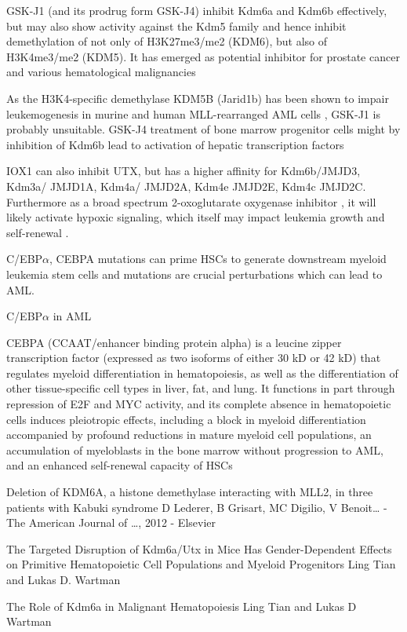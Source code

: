 GSK-J1 (and its prodrug form GSK-J4) inhibit Kdm6a and Kdm6b effectively\cite{Kruidenier2012}, but may also show activity against the Kdm5 family\cite{Heinemann2014} and hence inhibit demethylation of not only of H3K27me3/me2 (KDM6), but also of H3K4me3/me2 (KDM5). It has emerged as potential inhibitor for prostate cancer\cite{Morozov2017} and various hematological malignancies \cite{Mathur2017,Boila2017} 


As the H3K4-specific demethylase KDM5B (Jarid1b) has been shown to impair leukemogenesis in murine and human MLL-rearranged AML cells \cite{Wong2015}, GSK-J1 is probably unsuitable. GSK-J4 treatment of bone marrow progenitor cells might by inhibition of Kdm6b lead to activation of hepatic transcription factors \cite{Kochat2017}

IOX1 can also inhibit UTX, but has a higher affinity for Kdm6b/JMJD3, Kdm3a/ JMJD1A, Kdm4a/ JMJD2A, Kdm4e JMJD2E, Kdm4c JMJD2C.\cite{King2010,Schiller2014} Furthermore as a broad spectrum 2-oxoglutarate oxygenase inhibitor \cite{Hopkinson2013}, it will likely activate hypoxic signaling, which itself may impact leukemia growth and self-renewal \cite{Velasco-Hernandez2014,Roychoudhury2015}. 


C/EBP$\alpha$\cite{Rapino2013,Oevelen2015,Cirovic2017}, CEBPA mutations can prime HSCs to generate downstream myeloid leukemia stem cells\cite{Bereshchenko2009} and mutations are crucial perturbations which can lead to AML\cite{Pabst2007,Koschmieder2008}.

C/EBP$\alpha$ in AML
\cite{Hackanson2008}

CEBPA (CCAAT/enhancer binding protein alpha) is a leucine zipper transcription factor (expressed as two isoforms of either 30 kD or 42 kD) that regulates myeloid differentiation in hematopoiesis, as well as the differentiation of other tissue-specific cell types in liver, fat, and lung. It functions in part through repression of E2F and MYC activity, and its complete absence in hematopoietic cells induces pleiotropic effects, including a block in myeloid differentiation accompanied by profound reductions in mature myeloid cell populations, an accumulation of myeloblasts in the bone marrow without progression to AML, and an enhanced self-renewal capacity of HSCs \cite{Somervaille2009a} %


Deletion of KDM6A, a histone demethylase interacting with MLL2, in three patients with Kabuki syndrome
D Lederer, B Grisart, MC Digilio, V Benoit… - The American Journal of …, 2012 - Elsevier

The Targeted Disruption of Kdm6a/Utx in Mice Has Gender-Dependent Effects on Primitive Hematopoietic Cell Populations and Myeloid Progenitors 
Ling Tian and Lukas D. Wartman

The Role of Kdm6a in Malignant Hematopoiesis
Ling Tian and Lukas D Wartman